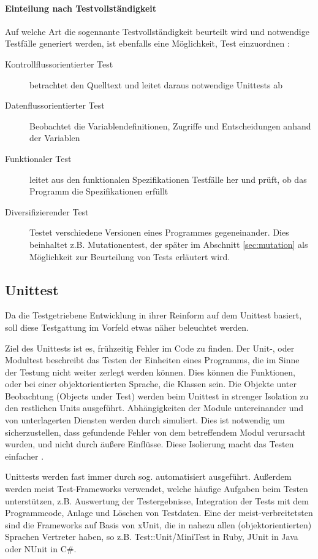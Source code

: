 \paragraph{Einteilung nach Testvollständigkeit} Auf welche Art die sogennante Testvollständigkeit beurteilt wird und notwendige Testfälle generiert werden, ist ebenfalls eine Möglichkeit, Test einzuordnen \citep{liggesmeyer_modultest_1990}:
\begin{description}
 \item[Kontrollflussorientierter Test] betrachtet den Quelltext und leitet daraus notwendige Unittests ab
 \item[Datenflussorientierter Test] Beobachtet die Variablendefinitionen, Zugriffe und Entscheidungen anhand der Variablen
 \item[Funktionaler Test] leitet aus den funktionalen Spezifikationen Testfälle her und prüft, ob das Programm die Spezifikationen erfüllt
 \item[Diversifizierender Test] Testet verschiedene Versionen eines Programmes gegeneinander. Dies beinhaltet z.B. Mutationentest, der später im Abschnitt \ref{sec:mutation} \textit{} als Möglichkeit zur Beurteilung von Tests erläutert wird.
\end{description}
\subsection{Unittest}
\label{sec:testUnit}
Da die Testgetriebene Entwicklung in ihrer Reinform auf dem Unittest basiert, soll diese Testgattung im Vorfeld etwas näher beleuchtet werden.

Ziel des Unittests ist es, frühzeitig Fehler im Code zu finden. Der Unit-, oder Modultest beschreibt das Testen der Einheiten eines Programms, die im Sinne der Testung nicht weiter zerlegt werden können. Dies können die Funktionen, oder bei einer objektorientierten Sprache, die Klassen sein. Die Objekte unter Beobachtung (Objects under Test) werden beim Unittest in strenger Isolation zu den restlichen Units ausgeführt. Abhängigkeiten der Module untereinander und von unterlagerten Diensten werden durch  simuliert. Dies ist notwendig um sicherzustellen, dass gefundende Fehler von dem betreffendem Modul verursacht wurden, und nicht durch äußere Einflüsse. Diese Isolierung macht das Testen einfacher \citep{goodliffe_code_2006}.



Unittests werden fast immer durch sog.  automatisiert ausgeführt. Außerdem werden meist Test-Frameworks verwendet, welche häufige Aufgaben beim Testen unterstützen, z.B. Auswertung der Testergebnisse, Integration der Tests mit dem Programmcode, Anlage und Löschen von Testdaten.  Eine der meist-verbreitetsten sind die Frameworks auf Basis von xUnit, die in nahezu allen (objektorientierten) Sprachen Vertreter haben, so z.B. Test::Unit/MiniTest in Ruby, JUnit in Java oder NUnit in C\#.

